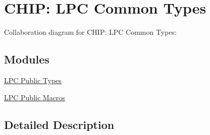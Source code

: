 \hypertarget{group___l_p_c___types}{}\section{C\+H\+IP\+: L\+PC Common Types}
\label{group___l_p_c___types}
Collaboration diagram for C\+H\+IP\+: L\+PC Common Types\+:
\subsection*{Modules}
\begin{DoxyCompactItemize}
\item 
\hyperlink{group___l_p_c___types___public___types}{L\+P\+C Public Types}
\item 
\hyperlink{group___l_p_c___types___public___macros}{L\+P\+C Public Macros}
\end{DoxyCompactItemize}


\subsection{Detailed Description}

